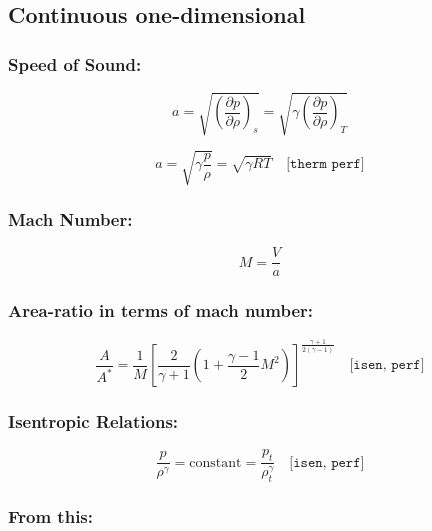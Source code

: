 \subsection*{Continuous one-dimensional}

\subsubsection*{Speed of Sound:}

\begin{equation}
	a = \sqrt{\left( \frac{\partial p}{\partial \rho} \right)_s} = \sqrt{\gamma \left( \frac{\partial p}{\partial \rho} \right)_T}
\end{equation}

\begin{equation}
	a = \sqrt{\gamma \frac{p}{\rho}} = \sqrt{\gamma RT} \quad \texttt{[therm perf]}
\end{equation}

\subsubsection*{Mach Number:}

\begin{equation}
	M = \frac{V}{a}
\end{equation}

\subsubsection*{Area-ratio in terms of mach number:}
\begin{equation}
	\frac{A}{A^*} = \frac{1}{M} \left[ \frac{2}{\gamma + 1} \left( 1 + \frac{\gamma - 1}{2} M^2 \right) \right]^{\frac{\gamma + 1}{2(\gamma - 1)}}
	\quad \texttt{[isen, perf]}     
	\label{eq:area_ratio_mach}
\end{equation}
\subsubsection*{Isentropic Relations:}

\begin{equation}
	\frac{p}{\rho^\gamma} = \text{constant} = \frac{p_t}{\rho_t^\gamma}
	\quad \texttt{[isen, perf]}
\end{equation}

\subsubsection*{From this:}

